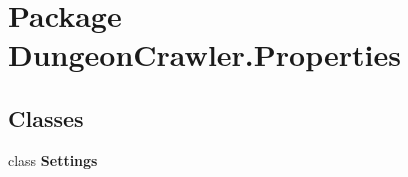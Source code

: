 \hypertarget{namespace_dungeon_crawler_1_1_properties}{}\section{Package Dungeon\+Crawler.\+Properties}
\label{namespace_dungeon_crawler_1_1_properties}
\subsection*{Classes}
\begin{DoxyCompactItemize}
\item 
class {\bfseries Settings}
\end{DoxyCompactItemize}
